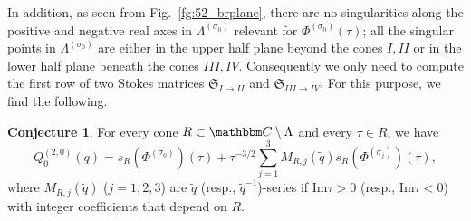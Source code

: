 \documentclass[12pt,reqno]{amsart}
\theoremstyle{definition}
\newtheorem{conjecture}[theorem]{Conjecture}
\def\BC{\mathbbm C}
\def\s{\sigma}
\def\tq{\tilde{q}}
\def\-{\,-\,}
\def\Im{\mathrm{Im}}
\def\bJ{\mathbf J}
\def\RED{\mathrm{red}}
\def\mf{\mathfrak}
\begin{document}

In addition, as seen from Fig.~\ref{fg:52_brplane}, there are no
singularities along the positive and negative real axes in
$\Lambda^{(\s_0)}$ relevant for $\Phi^{(\s_0)}(\tau)$; all the
singular points in $\Lambda^{(\s_0)}$ are either in the upper half
plane beyond the cones $I,II$ or in the lower half plane beneath the
cones $III,IV$. Consequently we only need to compute the first row of
two Stokes matrices $\mf{S}_{I\rightarrow II}$ and
$\mf{S}_{III\rightarrow IV}$.  For this purpose, we find the following.

\begin{conjecture}
  For every cone $R \subset \BC\setminus\Lambda$ and every $\tau \in R$,
  we have
  \begin{equation}
    Q_0^{(2,0)}(q) = s_R(\Phi^{(\s_0)})(\tau) +
    \tau^{-3/2}\sum_{j=1}^3 M_{R,j}(\tq)s_R(\Phi^{(\s_j)})(\tau),
    \label{eq:QMPhi}
  \end{equation}
  where $M_{R,j}(\tq)$ ($j=1,2,3$) are $\tq$ (resp., $\tq^{-1}$)-series 
  if $\Im\tau>0$ (resp., $\Im\tau<0$) with integer coefficients that depend on
  $R$.
\end{conjecture}
\end{document}
